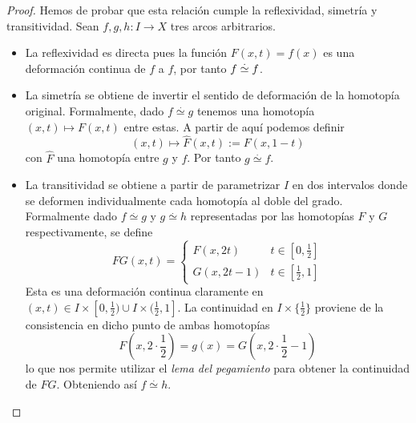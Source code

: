 \begin{proof}
  Hemos de probar que esta relación cumple la reflexividad, simetría y
  transitividad. Sean \(f,g,h : I \to X\) tres arcos arbitrarios.
  \begin{itemize}
  \item La reflexividad es directa pues la función \(F(x,t) = f(x)\) es
    una deformación continua de \(f\) a \(f\), por tanto \(f \stackrel{.}{\simeq}
    f\).

  \item La simetría se obtiene de invertir el sentido de deformación de la
    homotopía original. Formalmente, dado \(f \stackrel{.}{\simeq} g\)
    tenemos una homotopía \((x,t) \mapsto F(x,t)\) entre estas. A partir
    de aquí podemos definir
    \begin{equation}
      \label{eq:homotopy-simetry}
      (x,t) \mapsto \hat{F}(x,t) := F(x,1-t)
    \end{equation}
    con \(\hat{F}\) una homotopía entre \(g\) y \(f\). Por tanto \(g
    \stackrel{.}{\simeq} f\).

  \item La transitividad se obtiene a partir de parametrizar \(I\) en dos
    intervalos donde se deformen individualmente cada homotopía al doble
    del grado. Formalmente dado \(f \stackrel{.}{\simeq} g\) y \(g
    \stackrel{.}{\simeq} h\) representadas por las homotopías \(F\) y
    \(G\) respectivamente, se define
    \[ FG(x,t) = \begin{cases}
        F(x,2t) & t \in [0,\frac{1}{2}] \\
        G(x,2t - 1) & t \in [ \frac{1}{2} , 1]
      \end{cases}
    \]
    Esta es una deformación continua claramente en \((x,t) \in I \times
    [0, \frac{1}{2}) \cup I \times (\frac{1}{2}, 1]\). La continuidad en
    \(I \times \{\frac{1}{2}\}\) proviene de la consistencia en dicho
    punto de ambas homotopías
    \[ F(x,2 \cdot \frac{1}{2}) = g(x) = G(x, 2 \cdot \frac{1}{2} - 1)\]
    lo que nos permite utilizar el \emph{lema del pegamiento}
    \cite[p.~108]{munkres} para obtener la continuidad de \(FG\).
    Obteniendo así \(f \stackrel{.}{\simeq} h\).
  \end{itemize}
\end{proof}

